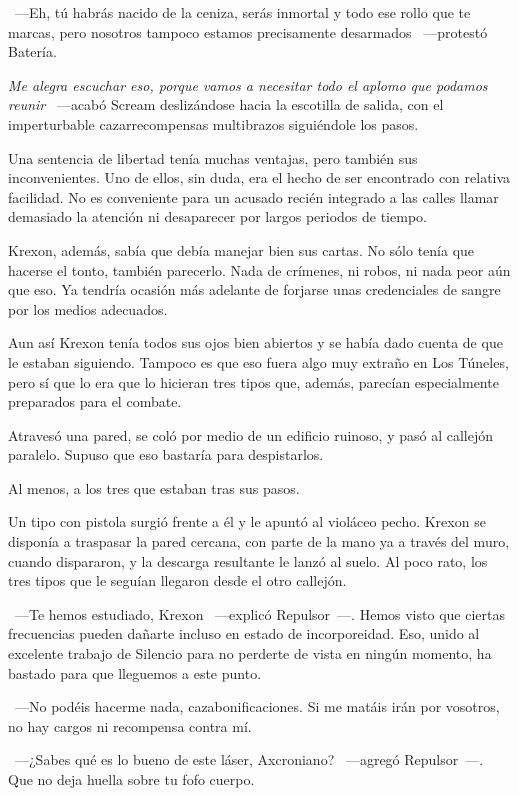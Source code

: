 ~---Eh, tú habrás nacido de la ceniza, serás inmortal y todo ese rollo que te marcas, pero nosotros tampoco estamos precisamente desarmados ~---protestó Batería.

\emph{Me alegra escuchar eso, porque vamos a necesitar todo el aplomo que podamos reunir} ~---acabó Scream deslizándose hacia la escotilla de salida, con el imperturbable cazarrecompensas multibrazos siguiéndole los pasos.

\parbreak
Una sentencia de libertad tenía muchas ventajas, pero también sus inconvenientes. Uno de ellos, sin duda, era el hecho de ser encontrado con relativa facilidad. No es conveniente para un acusado recién integrado a las calles llamar demasiado la atención ni desaparecer por largos periodos de tiempo.

Krexon, además, sabía que debía manejar bien sus cartas. No sólo tenía que hacerse el tonto, también parecerlo. Nada de crímenes, ni robos, ni nada peor aún que eso. Ya tendría ocasión más adelante de forjarse unas credenciales de sangre por los medios adecuados.

Aun así Krexon tenía todos sus ojos bien abiertos y se había dado cuenta de que le estaban siguiendo. Tampoco es que eso fuera algo muy extraño en Los Túneles, pero sí que lo era que lo hicieran tres tipos que, además, parecían especialmente preparados para el combate.

Atravesó una pared, se coló por medio de un edificio ruinoso, y pasó al callejón paralelo. Supuso que eso bastaría para despistarlos.

Al menos, a los tres que estaban tras sus pasos.

Un tipo con pistola surgió frente a él y le apuntó al violáceo pecho. Krexon se disponía a traspasar la pared cercana, con parte de la mano ya a través del muro, cuando dispararon, y la descarga resultante le lanzó al suelo. Al poco rato, los tres tipos que le seguían llegaron desde el otro callejón.

~---Te hemos estudiado, Krexon ~---explicó Repulsor~---. Hemos visto que ciertas frecuencias pueden dañarte incluso en estado de incorporeidad. Eso, unido al excelente trabajo de Silencio para no perderte de vista en ningún momento, ha bastado para que lleguemos a este punto.

~---No podéis hacerme nada, cazabonificaciones. Si me matáis irán por vosotros, no hay cargos ni recompensa contra mí.

~---¿Sabes qué es lo bueno de este láser, Axcroniano? ~---agregó Repulsor~---. Que no deja huella sobre tu fofo cuerpo.

